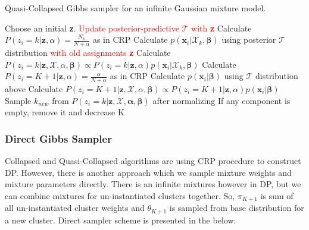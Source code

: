 \documentclass[a4paper]{article}
\begin{document}
\begin{algorithm}[H]
  \caption{Quasi-Collapsed Gibbs sampler for an infinite Gaussian mixture model.}\label{quasicollapsedgibbs}
  \begin{algorithmic}[1]
  \State Choose an initial \textbf{z}.
   
    \State \textcolor{red}{Update posterior-predictive $\mathcal{T}$ with \textbf{z}}
         
            \State Calculate $P(z_i = k | \mathbf{z},\alpha) = \frac{N_{k}}{N+\alpha}$ as in CRP
            \State Calculate $p(\mathbf{x}_i|\mathcal{X}_{k},\mathbf{\beta})$ using posterior $\mathcal{T}$ distribution \textcolor{red}{with old assignments \textbf{z}}
            \State Calculate $P(z_i = k | \mathbf{z},\mathcal{X},\alpha,\mathbf{\beta}) \propto P(z_i = k | \mathbf{z},\alpha) p(\mathbf{x}_i|\mathcal{X}_{k}, \mathbf{\beta})$
        \EndFor
        \State Calculate $P(z_i = K+1 | \mathbf{z},\alpha) = \frac{\alpha}{N+\alpha}$ as in CRP 
        \State Calculate $p(\mathbf{x}_i|\mathbf{\beta})$ using $\mathcal{T}$ distribution above
        \State Calculate $P(z_i = K+1 | \mathbf{z},\mathcal{X},\alpha, \mathbf{\beta}) \propto P(z_i = K+1 | \mathbf{z},\alpha)p(\mathbf{x}_i|\mathbf{\beta})$
        \State Sample $k_{new}$ from $P(z_i = k | \mathbf{z},\mathcal{X},\mathbf{\alpha},\mathbf{\beta})$ after normalizing
    \EndFor
    \State If any component is empty, remove it and decrease K

  \EndFor
  \end{algorithmic}
\end{algorithm}

\subsubsection{Direct Gibbs Sampler}

Collapsed and Quasi-Collapsed algorithms are using CRP procedure to construct DP. However, there is another approach which we sample mixture weights and mixture parameters directly. There is an infinite mixtures however in DP, but we can combine mixtures for un-instantiated clusters together. So, $\pi_{K+1}$ is sum of all un-instantiated cluster weights and $\theta_{K+1}$ is sampled from base distribution for a new cluster. Direct sampler scheme is presented in the below:
\end{document}
